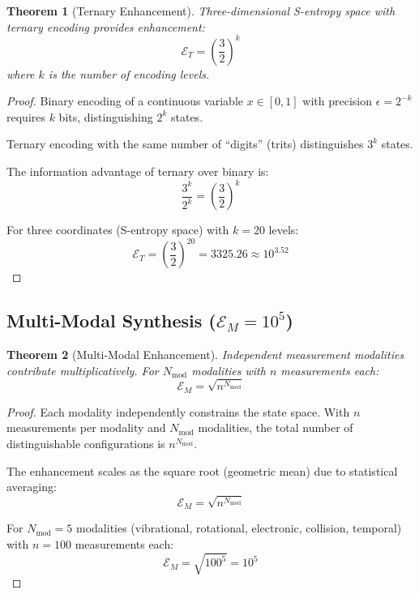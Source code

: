 \documentclass[twocolumn,10pt,twoside]{article}
\newtheorem{theorem}{Theorem}[section]
\newcommand{\Enh}{\mathcal{E}}
\begin{document}
\begin{theorem}[Ternary Enhancement]
\label{thm:ternary}
Three-dimensional S-entropy space with ternary encoding provides enhancement:
\begin{equation}
\Enh_T = \left(\frac{3}{2}\right)^k
\end{equation}
where $k$ is the number of encoding levels.
\end{theorem}

\begin{proof}
Binary encoding of a continuous variable $x \in [0,1]$ with precision $\epsilon = 2^{-k}$ requires $k$ bits, distinguishing $2^k$ states.

Ternary encoding with the same number of ``digits'' (trits) distinguishes $3^k$ states.

The information advantage of ternary over binary is:
\begin{equation}
\frac{3^k}{2^k} = \left(\frac{3}{2}\right)^k
\end{equation}

For three coordinates (S-entropy space) with $k = 20$ levels:
\begin{equation}
\Enh_T = \left(\frac{3}{2}\right)^{20} = 3325.26 \approx 10^{3.52}
\end{equation}
\end{proof}

\subsection{Multi-Modal Synthesis ($\Enh_M = 10^{5}$)}

\begin{theorem}[Multi-Modal Enhancement]
\label{thm:multimodal}
Independent measurement modalities contribute multiplicatively. For $N_{\text{mod}}$ modalities with $n$ measurements each:
\begin{equation}
\Enh_M = \sqrt{n^{N_{\text{mod}}}}
\end{equation}
\end{theorem}

\begin{proof}
Each modality independently constrains the state space. With $n$ measurements per modality and $N_{\text{mod}}$ modalities, the total number of distinguishable configurations is $n^{N_{\text{mod}}}$.

The enhancement scales as the square root (geometric mean) due to statistical averaging:
\begin{equation}
\Enh_M = \sqrt{n^{N_{\text{mod}}}}
\end{equation}

For $N_{\text{mod}} = 5$ modalities (vibrational, rotational, electronic, collision, temporal) with $n = 100$ measurements each:
\begin{equation}
\Enh_M = \sqrt{100^5} = 10^5
\end{equation}
\end{proof}
\end{document}
